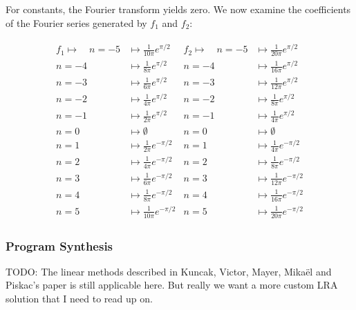 \documentclass[12pt]{article}
\begin{document}
For constants, the Fourier transform yields zero.
We now examine the coefficients of the Fourier series generated by $f_1$
and $f_2$:


\begin{align}
  \begin{split}
    f_1 \mapsto \quad
      n = -5 & \mapsto \frac{1}{10 \pi} e^{\pi / 2} \\
      n = -4 & \mapsto \frac{1}{8 \pi} e^{\pi / 2} \\
      n = -3 & \mapsto \frac{1}{6 \pi} e^{\pi / 2} \\
      n = -2 & \mapsto \frac{1}{4 \pi} e^{\pi / 2} \\
      n = -1 & \mapsto \frac{1}{2 \pi} e^{\pi / 2} \\
      n = 0 & \mapsto \emptyset \\
      n = 1 & \mapsto \frac{1}{2 \pi} e^{- \pi / 2} \\
      n = 2 & \mapsto \frac{1}{4 \pi} e^{- \pi / 2} \\
      n = 3 & \mapsto \frac{1}{6 \pi} e^{- \pi / 2} \\
      n = 4 & \mapsto \frac{1}{8 \pi} e^{- \pi / 2} \\
      n = 5 & \mapsto \frac{1}{10 \pi} e^{- \pi / 2}
  \end{split}
  \begin{split}
    f_2 \mapsto \quad
      n = -5 & \mapsto \frac{1}{20 \pi} e^{\pi / 2} \\
      n = -4 & \mapsto \frac{1}{16 \pi} e^{\pi / 2} \\
      n = -3 & \mapsto \frac{1}{12 \pi} e^{\pi / 2} \\
      n = -2 & \mapsto \frac{1}{8 \pi} e^{\pi / 2} \\
      n = -1 & \mapsto \frac{1}{4 \pi} e^{\pi / 2} \\
      n = 0 & \mapsto \emptyset \\
      n = 1 & \mapsto \frac{1}{4 \pi} e^{- \pi / 2} \\
      n = 2 & \mapsto \frac{1}{8 \pi} e^{- \pi / 2} \\
      n = 3 & \mapsto \frac{1}{12 \pi} e^{- \pi / 2} \\
      n = 4 & \mapsto \frac{1}{16 \pi} e^{- \pi / 2} \\
      n = 5 & \mapsto \frac{1}{20 \pi} e^{- \pi / 2}
  \end{split}
\end{align}

\subsubsection{Program Synthesis}
TODO: The linear methods described in Kuncak, Victor, Mayer, Mika\"{e}l
and Piskac's paper is still applicable here.
But really we want a more custom LRA solution that I need to read up on.
\end{document}
